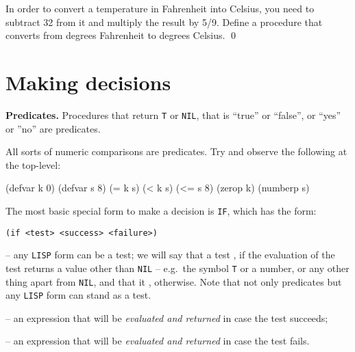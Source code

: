 \documentclass[a4paper,11pt]{article}
\begin{document}
\begin{uexercise}
In order to convert a temperature in Fahrenheit into Celsius, you need to subtract 32 from it and multiply the result by 5/9. Define a procedure that converts from degrees Fahrenheit to degrees Celsius.
\qed
\end{uexercise}


\noindent\hrulefill

\newpage

\section{Making decisions}

\begin{uenum}
\item {\bf Predicates.} Procedures that return \Verb+T+ or \Verb+NIL+, that is ``true'' or ``false'', or ``yes'' or ''no'' are predicates.
\begin{uenumi}
\item All sorts of numeric comparisons are predicates. Try and observe the following at the top-level:

\begin{lispcode}
(defvar k 0)
(defvar s 8)
(= k s)
(< k s)
(<= s 8)
(zerop k)
(numberp s)
\end{lispcode}

\end{uenumi}

\item The most basic special form to make a decision is \Verb+IF+, which has the form:

\begin{Verbatim}
(if <test> <success> <failure>)
\end{Verbatim}

\begin{uenumi}
\item {} -- any \Verb+LISP+ form can be a test; we will say that a test , if the evaluation of the test returns a value other than \Verb+NIL+ -- e.g.\ the symbol \Verb+T+ or a number, or any other thing apart from \Verb+NIL+, and that it , otherwise. Note that not only predicates but any \Verb+LISP+ form can stand as a test.
\item {} -- an expression that will be \emph{evaluated and returned} in case the test succeeds;
\item {} -- an expression that will be \emph{evaluated and returned} in case the test fails.
\end{uenumi}



\end{uenum}
\end{document}
